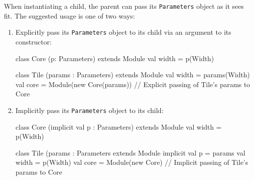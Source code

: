 \documentclass[10pt,twocolumn]{article}
\def\code#1{{\small\tt #1}}
\begin{document}
When instantiating a child, the parent can pass its \code{Parameters}
object as it sees fit. The suggested usage is one of two ways:

\begin{enumerate}
  \item Explicitly pass its \code{Parameters} object to its child via
    an argument to its constructor:
\begin{scala}

class Core (p: Parameters) extends Module { 
  val width = p(Width)
}
  
class Tile (params : Parameters) extends Module { 
  val width = params(Width) 
  val core = Module(new Core(params))
  // Explicit passing of Tile's params to Core
}

\end{scala}
  \item Implicitly pass its \code{Parameters} object to its child:
\begin{scala}

class Core (implicit val p : Parameters) extends Module { 
  val width = p(Width)
}

class Tile (params : Parameters extends Module { 
  implicit val p = params
  val width = p(Width)
  val core = Module(new Core)
  // Implicit passing of Tile's params to Core
}
\end{scala}
\end{enumerate}
\end{document}
